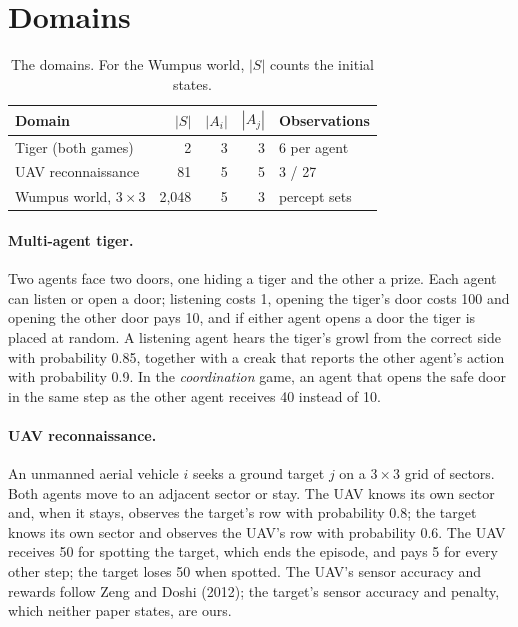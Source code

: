 \documentclass{article}
\begin{document}
\section{Domains}

\begin{table}[h]
\centering
\begin{tabular}{@{}lrrrl@{}}
\toprule
Domain & $|S|$ & $|A_i|$ & $|A_j|$ & Observations \\
\midrule
Tiger (both games) & 2 & 3 & 3 & 6 per agent \\
UAV reconnaissance & 81 & 5 & 5 & 3 / 27 \\
Wumpus world, $3 \times 3$ & 2{,}048 & 5 & 3 & percept sets \\
\bottomrule
\end{tabular}
\caption{The domains. For the Wumpus world, $|S|$ counts the initial states.}
\label{tab:domains}
\end{table}

\paragraph{Multi-agent tiger.} Two agents face two doors, one hiding a tiger and the other a prize. Each agent can listen or open a door; listening costs 1, opening the tiger's door costs 100 and opening the other door pays 10, and if either agent opens a door the tiger is placed at random. A listening agent hears the tiger's growl from the correct side with probability 0.85, together with a creak that reports the other agent's action with probability 0.9. In the \emph{coordination} game, an agent that opens the safe door in the same step as the other agent receives 40 instead of 10.

\paragraph{UAV reconnaissance.} An unmanned aerial vehicle $i$ seeks a ground target $j$ on a $3 \times 3$ grid of sectors. Both agents move to an adjacent sector or stay. The UAV knows its own sector and, when it stays, observes the target's row with probability 0.8; the target knows its own sector and observes the UAV's row with probability 0.6. The UAV receives 50 for spotting the target, which ends the episode, and pays 5 for every other step; the target loses 50 when spotted. The UAV's sensor accuracy and rewards follow Zeng and Doshi (2012); the target's sensor accuracy and penalty, which neither paper states, are ours.
\end{document}

